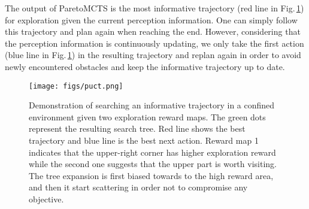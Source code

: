 The output of ParetoMCTS is the most informative trajectory (red line in Fig.\,\ref{fig:pareto_mcts}) for exploration given the current perception information.
One can simply follow this trajectory and plan again when reaching the end.
However, considering that the perception information is continuously updating, we only take the first action (blue line in Fig.\,\ref{fig:pareto_mcts}) in the resulting trajectory and replan again in order to avoid newly encountered obstacles and keep the informative trajectory up to date.

\begin{figure}[htbp]
    \centering
    \texttt{[image: figs/puct.png]}
    \caption{Demonstration of searching an informative trajectory in a confined environment given two exploration reward maps.
    The green dots represent the resulting search tree.
    Red line shows the best trajectory and blue line is the best next action.
    Reward map 1 indicates that the upper-right corner has higher exploration reward while the second one suggests that the upper part is worth visiting.
    The tree expansion is first biased towards to the high reward area, and then it start scattering in order not to compromise any objective.
    }
    \label{fig:pareto_mcts}
\end{figure}


